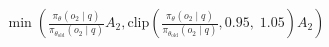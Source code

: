 \documentclass[preview]{standalone}
\begin{document}
\begin{align*}
\min \left(\frac{\pi_\theta(o_2 \mid q)}{\pi_{\theta_{\text{old}}}(o_2 \mid q)} A_2, \text{clip} \left( \frac{\pi_\theta(o_2 \mid q)}{\pi_{\theta_{\text{old}}}(o_2 \mid q)}, 0.95,\; 1.05 \right) A_2 \right)
\end{align*}
\end{document}
